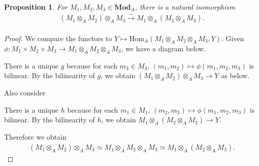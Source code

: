 \documentclass[12pt]{report}
\theoremstyle{plain}
\newtheorem{proposition}[theorem]{Proposition}
\theoremstyle{remark}
\theoremstyle{definition}
\newcommand{\Hom}[3]{\mathrm{Hom}_{#3}(#1,#2)}
\begin{document}
\begin{proposition}
    For $M_1,M_2,M_3\in\mathbf{Mod}_A$, there is a natural isomorphism
    \begin{align*}
        (M_1\otimes_A M_2)\otimes_A M_3\xrightarrow[]{\sim} M_1\otimes_A (M_2\otimes_A M_3).
    \end{align*}
\end{proposition}
\begin{proof}
    We compare the functors to $Y\mapsto \Hom{M_1\otimes_A M_2\otimes_A M_3}{Y}{A}$. Given $\phi:M_1\times M_2\times M_3\to M_1\otimes_A M_2\otimes_A M_3$, we have a diagram below.
    \begin{figure}[H]
        \centering
    \end{figure}
    \noindent There is a unique $g$ because for each $m_3\in M_3$, $(m_1,m_2)\mapsto\phi(m_1,m_2,m_3)$ is bilinear. By the bilinearity of $g$, we obtain $(M_1\otimes_A M_2)\otimes_A M_3\to Y$ as below.
    \begin{figure}[H]
        \centering
    \end{figure}
    \noindent Also consider
    \begin{figure}[H]
        \centering
    \end{figure}
    \noindent There is a unique $h$ because for each $m_1\in M_1$, $(m_2,m_3)\mapsto \phi(m_1,m_2,m_3)$ is bilinear. By the bilinearity of $h$, we obtain $M_1\otimes_A(M_2\otimes_A M_3)\to Y$.
    \begin{figure}[H]
        \centering
    \end{figure}
    \noindent Therefore we obtain
    \begin{align*}
        (M_1\otimes_A M_2)\otimes_A M_3\simeq M_1\otimes_A M_2\otimes_A M_3\simeq  M_1\otimes_A (M_2\otimes_A M_3).
    \end{align*}
\end{proof}
\end{document}
